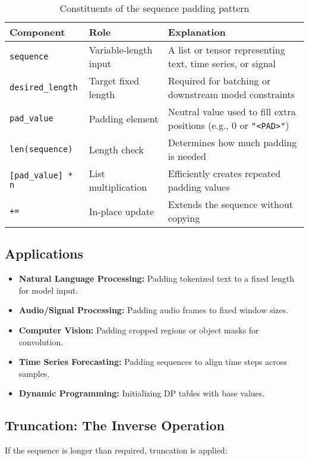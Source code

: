 \begin{table}[h]
	\centering
	\begin{tabular}{|p{3cm}|p{3cm}|p{7cm}|}
		\hline
		\textbf{Component} & \textbf{Role} & \textbf{Explanation} \\
		\hline
		\texttt{sequence} & Variable-length input & A list or tensor representing text, time series, or signal \\
		\texttt{desired\_length} & Target fixed length & Required for batching or downstream model constraints \\
		\texttt{pad\_value} & Padding element & Neutral value used to fill extra positions (e.g., 0 or \texttt{"<PAD>"}) \\
		\texttt{len(sequence)} & Length check & Determines how much padding is needed \\
		\texttt{[pad\_value] * n} & List multiplication & Efficiently creates repeated padding values \\
		\texttt{+=} & In-place update & Extends the sequence without copying \\
		\hline
	\end{tabular}
	\caption{Constituents of the sequence padding pattern}
\end{table}

\subsection*{Applications}

\begin{itemize}
	\item \textbf{Natural Language Processing:} Padding tokenized text to a fixed length for model input.
	\item \textbf{Audio/Signal Processing:} Padding audio frames to fixed window sizes.
	\item \textbf{Computer Vision:} Padding cropped regions or object masks for convolution.
	\item \textbf{Time Series Forecasting:} Padding sequences to align time steps across samples.
	\item \textbf{Dynamic Programming:} Initializing DP tables with base values.
\end{itemize}

\subsection*{Truncation: The Inverse Operation}

If the sequence is longer than required, truncation is applied:

